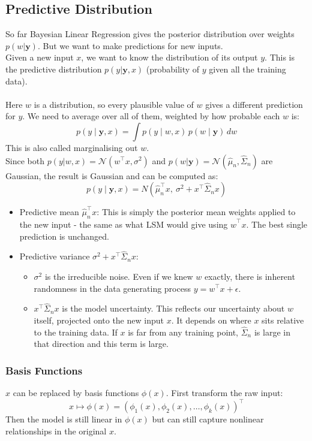 \documentclass[../Probability.tex]{subfiles}
\begin{document}
\subsection{Predictive Distribution}
So far Bayesian Linear Regression gives the posterior distribution over weights $p(w | \mathbf{y})$.
But we want to make predictions for new inputs.\\
Given a new input $x$, we want to know the distribution of its output $y$.
This is the predictive distribution $p(y | \mathbf{y}, x)$ (probability of $y$ given all the training data).\\
\\
Here $w$ is a distribution, so every plausible value of $w$ gives a different prediction for $y$. We need to average over all of them, weighted by how probable each $w$ is:
$$p(y \mid \mathbf{y}, x) = \int p(y \mid w, x)\, p(w \mid \mathbf{y})\, dw$$
This is also called marginalising out $w$.\\
Since both $p(y | w,x) = \mathcal{N}(w^\top x, \sigma^2)$ and $p(w | \mathbf{y}) = \mathcal{N}(\hat{\mu}_n, \hat{\Sigma}_n)$ are Gaussian, the result is Gaussian and can be computed as:
$$\boxed{p(y \mid \mathbf{y}, x) = N(\hat{\mu}_n^\top x,\ \sigma^2 + x^\top \hat{\Sigma}_n x)}$$
\begin{itemize}
    \item Predictive mean $\hat{\mu}^\top_n x$: This is simply the posterior mean weights applied to the new input - the same as what LSM would give using $\hat{w}^\top x$. The best single prediction is unchanged.
    \item Predictive variance $\sigma^2 + x^\top \hat{\Sigma}_n x$:
    \begin{itemize}
        \item $\sigma^2$ is the irreducible noise. Even if we knew $w$ exactly, there is inherent randomness in the data generating process $y = w^\top x + \epsilon$.
        \item $x^\top \hat{\Sigma}_n x$ is the model uncertainty. This reflects our uncertainty about $w$ itself, projected onto the new input $x$.
        It depends on where $x$ sits relative to the training data. If $x$ is far from any training point, $\hat{\Sigma}_n$ is large in that direction and this term is large.
    \end{itemize}
\end{itemize}

\subsubsection{Basis Functions}
$x$ can be replaced by basis functions $\phi(x)$. First transform the raw input:
$$x \mapsto \phi(x) = (\phi_1(x), \phi_2(x), \ldots, \phi_k(x))^\top$$
Then the model is still linear in $\phi(x)$ but can still capture nonlinear relationships in the original $x$.
\end{document}
